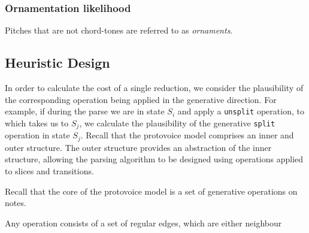 \documentclass[12pt,a4paper,twoside,openright]{report}
\theoremstyle{definition}
\begin{document}
\subsubsection{Ornamentation likelihood}
Pitches that are not chord-tones are referred to as \textit{ornaments}.


\subsection{Heuristic Design}

In order to calculate the cost of a single reduction, we consider the plausibility of the corresponding operation being applied in the generative direction. 
For example, if during the parse we are in state $S_i$ and apply a \texttt{unsplit} operation, to which takes us to $S_j$, we calculate the plausibility of the generative \texttt{split} operation in state $S_j$.
Recall that the protovoice model comprises an inner and outer structure. The outer structure provides an abstraction of the inner structure, allowing the parsing algorithm to be designed using operations applied to slices and transitions.

Recall that the core of the protovoice model is a set of generative operations on notes. 

Any operation consists of a set of regular edges, which are either neighbour
\end{document}
